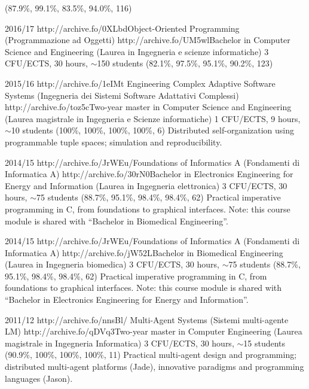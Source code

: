 \begin{outerlist}
        {(87.9\%, 99.1\%, 83.5\%, 94.0\%, 116)}
        {\oopjava}
    \item[2016/17]
        \unibocourse
        {http://archive.fo/0XLbd}{Object-Oriented Programming (Programmazione ad Oggetti)}
        {http://archive.fo/UM5wl}{Bachelor in Computer Science and Engineering (Laurea in Ingegneria e scienze informatiche)}
        {3 CFU/ECTS, 30 hours, $\sim$150 students}
        {(82.1\%, 97.5\%, 95.1\%, 90.2\%, 123)}
        {\oopjava}
    \item[2015/16]
        \unibocourse
        {http://archive.fo/1eIMt}{
            Engineering Complex Adaptive Software Systems
            (Ingegneria dei Sistemi Software Adattativi Complessi)
        }
        {http://archive.fo/toz5c}{Two-year master in Computer Science and Engineering (Laurea magistrale in Ingegneria e Scienze informatiche)}
        {1 CFU/ECTS, 9 hours, $\sim$10 students}
        {(100\%, 100\%, 100\%, 100\%, 6)}
        {Distributed self-organization using programmable tuple spaces; simulation and reproducibility.}
    \item[2014/15]
        \unibocourse
        {http://archive.fo/JrWEu/}{Foundations of Informatics A (Fondamenti di Informatica A)}
        {http://archive.fo/30rN0}{Bachelor in Electronics Engineering for Energy and Information (Laurea in Ingegneria elettronica)}
        {3 CFU/ECTS, 30 hours, $\sim$75 students}
        {(88.7\%, 95.1\%, 98.4\%, 98.4\%, 62)}
        {
            Practical imperative programming in C, from foundations to graphical interfaces.
            Note: this course module is shared with ``Bachelor in Biomedical Engineering''.
        }
    \item[2014/15]
        \unibocourse
        {http://archive.fo/JrWEu/}{Foundations of Informatics A (Fondamenti di Informatica A)}
        {http://archive.fo/jW52L}{Bachelor in Biomedical Engineering (Laurea in Ingegneria biomedica)}
        {3 CFU/ECTS, 30 hours, $\sim$75 students}
        {(88.7\%, 95.1\%, 98.4\%, 98.4\%, 62)}
        {
            Practical imperative programming in C, from foundations to graphical interfaces.
            Note: this course module is shared with ``Bachelor in Electronics Engineering for Energy and Information''.
        }
    \item[2011/12]
        \unibocourse
        {http://archive.fo/nnsBl/}
        {Multi-Agent Systems (Sistemi multi-agente LM)}
        {http://archive.fo/qDVq3}{Two-year master in Computer Engineering (Laurea magistrale in Ingegneria Informatica)}
        {3 CFU/ECTS, 30 hours, $\sim$15 students}
        {(90.9\%, 100\%, 100\%, 100\%, 11)}
        {Practical multi-agent design and programming; distributed multi-agent platforms (Jade), innovative paradigms and programming languages (Jason).}
\end{outerlist}

